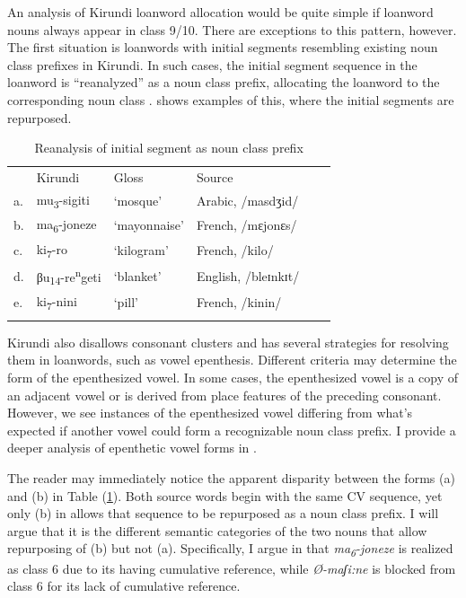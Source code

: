 \documentclass[output=paper,colorlinks,citecolor=brown,
]{langscibook}
\begin{document}
An analysis of Kirundi loanword allocation would be quite simple if loanword nouns always appear in class 9/10. There are exceptions to this pattern, however. The first situation is loanwords with initial segments resembling existing noun class prefixes in Kirundi. In such cases, the initial segment sequence in the loanword is “reanalyzed” as a noun class prefix, allocating the loanword to the corresponding noun class \citep{niyondagara1993kirundi, niyonkuru}.  shows examples of this, where the initial segments are repurposed.

\begin{table}
\caption{Reanalysis of initial segment as noun class prefix}
\label{tab:kinchsular:reanalysis}
\begin{tabular}{llllll}
  \lsptoprule
        & {Kirundi} & {Gloss} & {Source} \\
         a. & mu\textsubscript{3}-sigiti & `mosque' & Arabic, /masdʒid/ \\ 
            b. & ma\textsubscript{6}-joneze & `mayonnaise' & French, /mɛjonɛs/ \\ 
             c. & ki\textsubscript{7}-ro & `kilogram' & French, /kilo/\\
            d. & βu\textsubscript{14}-re\textsuperscript{n}geti & `blanket' & English, /bleɪnkɪt/  \\
            e. & ki\textsubscript{7}-nini & `pill' & French, /kinin/  \\
  \lspbottomrule
\end{tabular}
\end{table}

Kirundi also disallows consonant clusters and has several strategies for resolving them in loanwords, such as vowel epenthesis. Different criteria may determine the form of the epenthesized vowel. In some cases, the epenthesized vowel is a copy of an adjacent vowel or is derived from place features of the preceding consonant. However, we see instances of the epenthesized vowel differing from what's expected if another vowel could form a recognizable noun class prefix. I provide a deeper analysis of epenthetic vowel forms in .
\par The reader may immediately notice the apparent disparity between the forms (a) and (b) in Table (\ref{tab:kinchsular:reanalysis}). Both source words begin with the same CV sequence, yet only (b) in  allows that sequence to be repurposed as a noun class prefix. I will argue that it is the different semantic categories of the two nouns that allow repurposing of (b) but not (a). Specifically, I argue in  that \textit{ma\textsubscript{6}-joneze} is realized as class 6 due to its having cumulative reference, while \textit{Ø-maʃi:ne} is blocked from class 6 for its lack of cumulative reference.
\end{document}
